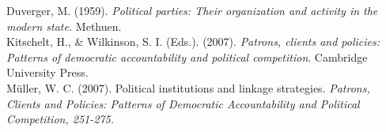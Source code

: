 \documentclass{article}
\begin{document}
\\
\\
\\
\\
\\
\\
\\
\\
\\
\\
\\
\\
\\
\\
\\
\\
\\
\\
\\
\\
\\
\\
\\
\\
\\
\\
\\

Duverger, M. (1959). \textit{Political parties: Their organization and activity in the modern state.} Methuen.\\

Kitschelt, H., \& Wilkinson, S. I. (Eds.). (2007). \textit{Patrons, clients and policies: Patterns of democratic accountability and political competition}. Cambridge University Press.\\

M\"uller, W. C. (2007). Political institutions and linkage strategies. \textit{Patrons, Clients and Policies: Patterns of Democratic Accountability and Political Competition, 251-275.}\\
\end{document}
